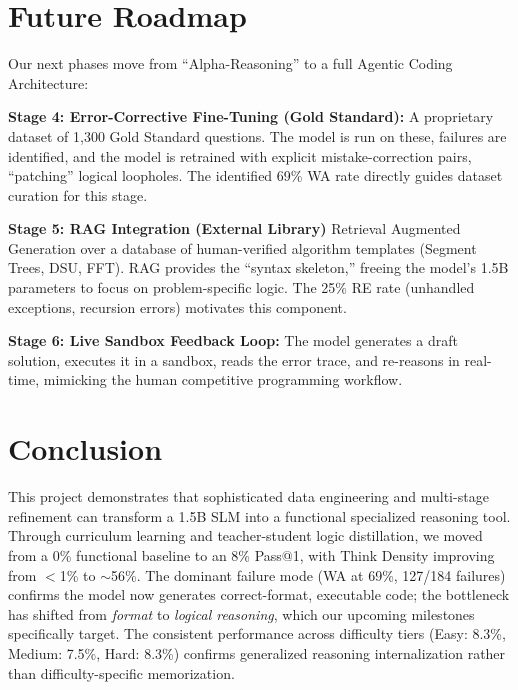 \documentclass[preprint,12pt]{elsarticle}
\begin{document}
\section{Future Roadmap}
\label{sec:future}

Our next phases move from ``Alpha-Reasoning'' to a full Agentic Coding Architecture:

\textbf{Stage 4: Error-Corrective Fine-Tuning (Gold Standard):} A proprietary dataset of 1,300 Gold Standard questions. The model is run on these, failures are identified, and the model is retrained with explicit mistake-correction pairs, ``patching'' logical loopholes. The identified 69\% WA rate directly guides dataset curation for this stage.

\textbf{Stage 5: RAG Integration (External Library)} 
Retrieval Augmented Generation over a database of human-verified algorithm templates (Segment Trees, DSU, FFT). RAG provides the ``syntax skeleton,'' freeing the model's 1.5B parameters to focus on problem-specific logic. The 25\% RE rate (unhandled exceptions, recursion errors) motivates this component.

\textbf{Stage 6: Live Sandbox Feedback Loop:} The model generates a draft solution, executes it in a sandbox, reads the error trace, and re-reasons in real-time, mimicking the human competitive programming workflow.

\section{Conclusion}
\label{sec:conclusion}

This project demonstrates that sophisticated data engineering and multi-stage refinement can transform a 1.5B SLM into a functional specialized reasoning tool. Through curriculum learning and teacher-student logic distillation, we moved from a 0\% functional baseline to an 8\% Pass@1, with Think Density improving from $<$1\% to $\sim$56\%. The dominant failure mode (WA at 69\%, 127/184 failures) confirms the model now generates correct-format, executable code; the bottleneck has shifted from \textit{format} to \textit{logical reasoning}, which our upcoming milestones specifically target. The consistent performance across difficulty tiers (Easy: 8.3\%, Medium: 7.5\%, Hard: 8.3\%) confirms generalized reasoning internalization rather than difficulty-specific memorization.
\end{document}
